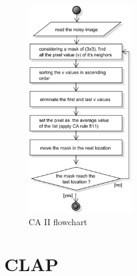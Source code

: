 \begin{figure}
	\centering
	\includegraphics[width=0.4\textwidth]{images/diagrams/flowchart_CAII}
	\caption{CA II flowchart \cite{bib:filter:CA}}
	\label{fig:diagram:flowchart:CAII}
\end{figure}



\section{CLAP}

